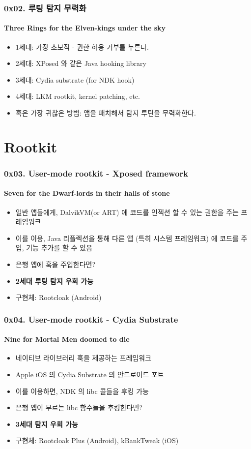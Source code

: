 \begin{frame}
  \frametitle{0x02. 루팅 탐지 무력화}
  \framesubtitle{Three Rings for the Elven-kings under the sky}

  \begin{itemize}
  \item 1세대: 가장 초보적 - 권한 허용 거부를 누른다.
  \item 2세대: XPosed 와 같은 Java hooking library
  \item 3세대: Cydia substrate (for NDK hook)
  \item 4세대: LKM rootkit, kernel patching, etc.
  \item <2-> 혹은 가장 귀찮은 방법: 앱을 패치해서 탐지 루틴을 무력화한다.
  \end{itemize}
\end{frame}

\section[Section]{Rootkit}
\begin{frame}
  \frametitle{0x03. User-mode rootkit - Xposed framework}
  \framesubtitle{Seven for the Dwarf-lords in their halls of stone}

  \begin{itemize}
  \item <1-> 일반 앱들에게, DalvikVM(or ART) 에 코드를 인젝션 할 수 있는 권한을 주는 프레임워크
  \item <2-> 이를 이용, Java 리플렉션을 통해 다른 앱 (특히 시스템 프레임워크) 에 코드를 주입, 기능 추가를 할 수 있음
  \item <3-> 은행 앱에 훅을 주입한다면?
  \item <4-> \textbf{2세대 루팅 탐지 우회 가능}
  \item <5-> 구현체: Rootcloak (Android)
  \end{itemize}
\end{frame}

\begin{frame}
  \frametitle{0x04. User-mode rootkit - Cydia Substrate}
  \framesubtitle{Nine for Mortal Men doomed to die}

  \begin{itemize}
  \item <1-> 네이티브 라이브러리 훅을 제공하는 프레임워크
  \item <2-> Apple iOS 의 Cydia Substrate 의 안드로이드 포트
  \item <3-> 이를 이용하면, NDK 의 libc 콜들을 후킹 가능
  \item <4-> 은행 앱이 부르는 libc 함수들을 후킹한다면?
  \item <5-> \textbf{3세대 탐지 우회 가능}
  \item <6-> 구현체: Rootcloak Plus (Android), kBankTweak (iOS)
  \end{itemize}
\end{frame}

